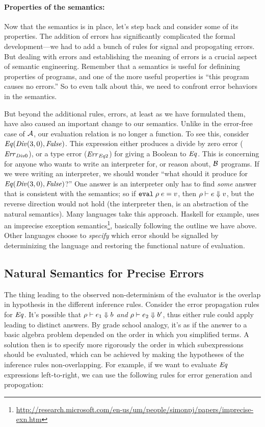 \paragraph{Properties of the semantics:}
Now that the semantics is in place, let's step back and consider some
of its properties.  The addition of errors has significantly
complicated the formal development---we had to add a bunch of rules
for signal and propogating errors.  But dealing with errors and
establishing the meaning of errors is a crucial aspect of semantic
engineering.  Remember that a semantics is useful for definining
properties of programs, and one of the more useful properties is
``this program causes no errors.''  So to even talk about this, we
need to confront error behaviors in the semantics.

But beyond the additional rules, errors, at least as we have
formulated them, have also caused an important change to our
semantics.  Unlike in the error-free case of $\mathcal{A}$, our evaluation
relation is no longer a function.  To see this, consider
$\mathit{Eq}(\mathit{Div}(3,0),\mathit{False})$.  This expression either produces a divide by
zero error ($\mathit{Err}_{\mathit{Div}0}$), or a type error ($\mathit{Err}_{\mathit{Eq}2}$) for giving a
Boolean to $\mathit{Eq}$.  This is concerning for anyone who wants to write an
interpreter for, or reason about, $\mathcal{B}$ programs.  If we were
writing an interpreter, we should wonder ``what should it produce for
$\mathit{Eq}(\mathit{Div}(3,0),\mathit{False})$?''  One answer is an interpreter only has to
find \emph{some} answer that is consistent with the semantics; so if
${\tt eval}\; \rho\; e = v$, then ${\rho} \vdash {e} \Downarrow {v}$,
but the reverse direction would not hold (the interpreter then, is an
abstraction of the natural semantics).  Many languages take this
approach.  Haskell for example, uses an imprecise exception
semantics\footnote{\url{http://research.microsoft.com/en-us/um/people/simonpj/papers/imprecise-exn.htm}},
basically following the outline we have above.  Other languages choose
to \emph{specify} which error should be signalled by determinizing the
language and restoring the functional nature of evaluation.

\subsection{Natural Semantics for Precise Errors}

The thing leading to the observed non-determinism of the evaluator is
the overlap in hypothesis in the different inference rules.  Consider the error
propagation rules for $\mathit{Eq}$.  It's possible that
${\rho} \vdash {e_1} \Downarrow {b}$ \emph{and}
${\rho} \vdash {e_2} \Downarrow {b'}$, thus either rule could apply leading
to distinct answers.  By grade school analogy, it's as if the answer
to a basic algebra problem depended on the order in which you
simplified terms.  A solution then is to specify more rigorously the
order in which subexpressions should be evaluated, which can be
achieved by making the hypotheses of the inference rules
non-overlapping.  For example, if we want to evaluate $\mathit{Eq}$
expressions left-to-right, we can use the following rules for error
generation and propogation:

